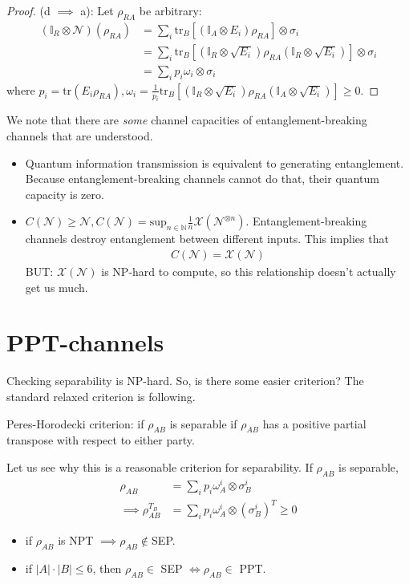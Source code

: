 \documentclass[../../note.tex]{subfiles}
\begin{document}
\begin{proof}
 (d $\implies$ a): Let $\rho_{RA}$ be arbitrary: 
 \begin{align}
     (\mathbb{I}_R \otimes \mathcal{N})(\rho_{RA}) &= \sum_i \text{tr}_B \left[(\mathbb{I}_A \otimes E_i)\rho_{RA}\right]\otimes \sigma_i \\
     &= \sum_i \text{tr}_B \left[(\mathbb{I}_R \otimes \sqrt{E_i}) \rho_{RA}(\mathbb{I}_R \otimes \sqrt{E_i})\right] \otimes \sigma_i \\
     &= \sum_i p_i \omega_i \otimes \sigma_i
 \end{align}
 where $p_i = \text{tr}(E_i \rho_{RA}), \omega_i = \frac{1}{p_i} \text{tr}_B \left[(\mathbb{I}_R \otimes \sqrt{E_i})\rho_{RA} (\mathbb{I}_A \otimes \sqrt{E_i})\right]\geq 0$. 
\end{proof}

We note that there are \textit{some} channel capacities of entanglement-breaking channels that are understood.
\begin{itemize}
    \item Quantum information transmission is equivalent to generating entanglement. Because entanglement-breaking channels cannot do that, their quantum capacity is zero.
    \item $C(\mathcal{N}) \geq \mathcal{N}, C(\mathcal{N})=\text{sup}_{n \in \mathbb{N}} \frac{1}{n} \mathcal{X}(\mathcal{N}^{\otimes n})$. Entanglement-breaking channels destroy entanglement between different inputs. This implies that 
    \begin{align}
        C(\mathcal{N}) = \mathcal{X}(\mathcal{N})
    \end{align}
    BUT: $\mathcal{X}(\mathcal{N})$ is NP-hard to compute, so this relationship doesn't actually get us much.
\end{itemize}
\section{PPT-channels}
Checking separability is NP-hard. So, is there some easier criterion? The standard relaxed criterion is following.

\begin{definition}
Peres-Horodecki criterion: if $\rho_{AB}$ is separable if $\rho_{AB}$ has a positive partial transpose with respect to either party.  
\end{definition}
Let us see why this is a reasonable criterion for separability. If $\rho_{AB}$ is separable, 
\begin{align}
    \rho_{AB} &= \sum_i p_i \omega_A^i \otimes \sigma_B^i \\
    \implies  \rho_{AB}^{T_B} &= \sum_i p_i \omega_A^i \otimes (\sigma_B^i)^T \geq 0
\end{align}
\begin{itemize}
    \item if $\rho_{AB}$ is NPT $\implies \rho_{AB} \notin$SEP. 
    \item if $|A|\cdot |B| \leq 6$, then $\rho_{AB} \in$ SEP $\Leftrightarrow \rho_{AB} \in$ PPT.  
\end{itemize}
\end{document}
